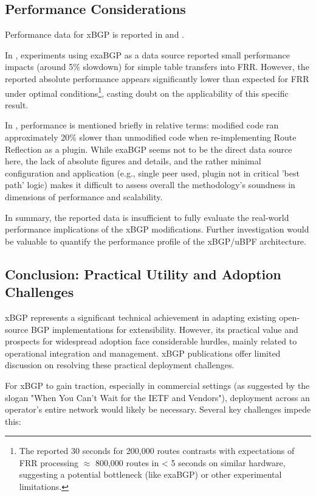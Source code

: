 \subsection{Performance Considerations}

Performance data for xBGP is reported in \cite{wirtgen2019} and \cite{Wirtgen2020}.

In \cite{wirtgen2019}, experiments using exaBGP as a data source reported small performance impacts (around 5\% slowdown) for simple table transfers into FRR. However, the reported absolute performance appears significantly lower than expected for FRR under optimal conditions\footnote{The reported 30 seconds for 200,000 routes contrasts with expectations of FRR processing $\approx$ 800,000 routes in < 5 seconds on similar hardware, suggesting a potential bottleneck (like exaBGP) or other experimental limitations.}, casting doubt on the applicability of this specific result.

In \cite{Wirtgen2020}, performance is mentioned briefly in relative terms: modified code ran approximately 20\% slower than unmodified code when re-implementing Route Reflection as a plugin. While exaBGP seems not to be the direct data source here, the lack of absolute figures and details, and the rather minimal configuration and application (e.g., single peer used, plugin not in critical 'best path' logic) makes it difficult to assess overall the methodology's soundness in dimensions of performance and scalability.

In summary, the reported data is insufficient to fully evaluate the real-world performance implications of the xBGP modifications. Further investigation would be valuable to quantify the performance profile of the xBGP/uBPF architecture.

\subsection{Conclusion: Practical Utility and Adoption Challenges}

xBGP represents a significant technical achievement in adapting existing open-source BGP implementations for extensibility. However, its practical value and prospects for widespread adoption face considerable hurdles, mainly related to operational integration and management. xBGP publications offer limited discussion on resolving these practical deployment challenges.

For xBGP to gain traction, especially in commercial settings (as suggested by the slogan "When You Can’t Wait for the IETF and Vendors"), deployment across an operator's entire network would likely be necessary. Several key challenges impede this:

